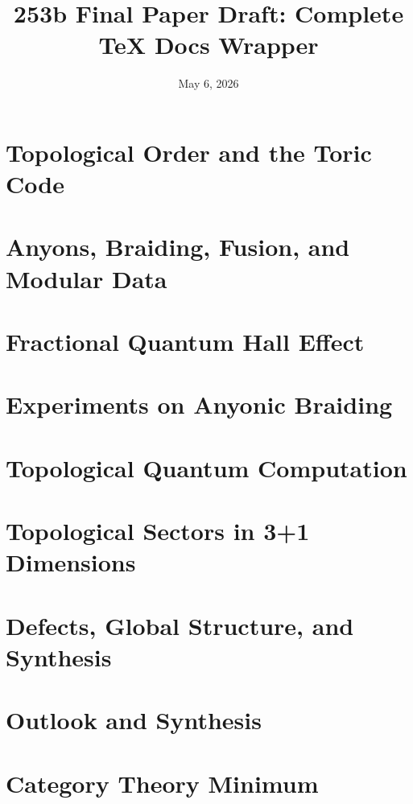\documentclass[11pt]{report}
\title{253b Final Paper Draft: Complete TeX Docs Wrapper}
\author{}
\date{May 6, 2026}
\begin{document}
\maketitle
\tableofcontents










\chapter{Topological Order and the Toric Code}\label{ch:topological-order}

\chapter{Anyons, Braiding, Fusion, and Modular Data}\label{ch:anyons}

\chapter{Fractional Quantum Hall Effect}\label{ch:fqhe}

\chapter{Experiments on Anyonic Braiding}\label{ch:experiments}

\chapter{Topological Quantum Computation}\label{ch:tqc}

\chapter{Topological Sectors in 3+1 Dimensions}\label{ch:sectors-3plus1d}

\chapter{Defects, Global Structure, and Synthesis}\label{ch:defects-synthesis}

\chapter{Outlook and Synthesis}\label{ch:outlook}


\appendix

\chapter{Category Theory Minimum}

\end{document}
